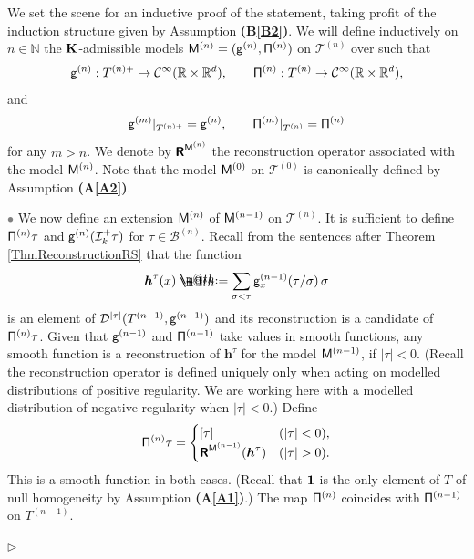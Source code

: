 \documentclass[10pt, reqno]{amsart}
\makeatletter
\numberwithin{subsection}{section}
\numberwithin{subsubsection}{subsection}
\numberwithin{equation}{section} %
\newenvironment{Dem}[1][\unskip]{%
    \begin{list}{\hspace{1.15cm}{\sf \textbf{{\small Proof #1 --}}}}{%
        \setlength{\topsep}{0pt}%
        \setlength{\leftmargin}{0pt}%
        \setlength{\rightmargin}{0pt}%
        \setlength{\listparindent}{0pt}%
        \setlength{\itemindent}{0pt}%
        \setlength{\parsep}{0pt}%
        \addtolength{\leftmargin}{0pt}%
        \addtolength{\rightmargin}{0pt}%
    } \item }{\hfill $\rhd$\end{list}\smallskip}
\theoremstyle{mystyle}
\theoremstyle{mystyle2}
\theoremstyle{mystyle3}
\newcommand{\refA}[1]{\textbf{\textsf{(A\ref{#1})}}}
\newcommand{\refB}[1]{\textbf{\textsf{(B\ref{#1})}}}
\newcommand{\bsh}{\boldsymbol{h}}
\newcommand{\ssk}{\smallskip}
\newcommand\bbN{\mathbb{N}}
\newcommand\bbR{\mathbb{R}}
\newcommand{\mcB}{\mathcal{B}}
\newcommand{\mcC}{\mathcal{C}}
\newcommand{\mcD}{\mathcal{D}}
\newcommand{\mcI}{\mathcal{I}}
\newcommand*{\defeq}{\mathrel{\rlap{%
                     \raisebox{0.3ex}{$\m@th\cdot$}}%
                     \raisebox{-0.3ex}{$\m@th\cdot$}}%
                     =}
\makeatother
\begin{document}
\begin{Dem}
We set the scene for an inductive proof of the statement, taking profit of the induction structure given by Assumption \refB{B2}. 
We will define inductively on $n\in\bbN$ the $\bf K$-admissible models ${\sf M}^{(n)}=({\sf g}^{(n)}, {\sf \Pi}^{(n)})$ on $\mathscr{T}^{(n)}$ over such that
$$
{\sf g}^{(n)} : T^{(n)+} \to \mcC^\infty(\bbR\times\bbR^d),\qquad
{\sf\Pi}^{(n)} : T^{(n)} \to \mcC^\infty(\bbR\times\bbR^d),
$$
and
$$
{\sf g}^{(m)}\vert_{T^{(n)+}}={\sf g}^{(n)},\qquad
{\sf\Pi}^{(m)}\vert_{T^{(n)}}={\sf\Pi}^{(n)}
$$
for any $m>n$. We denote by $\textsf{\textbf{R}}^{{\sf M}^{(n)}}$ the reconstruction operator associated with the model ${\sf M}^{(n)}$.
Note that the model ${\sf M}^{(0)}$ on $\mathscr{T}^{(0)}$ is canonically defined by Assumption \refA{A2}.

\ssk

\textcolor{gray}{$\bullet$} 
We now define an extension ${\sf M}^{(n)}$ of ${\sf M}^{(n-1)}$ on $\mathscr{T}^{(n)}$. It is sufficient to define ${\sf \Pi}^{(n)}\tau$ and ${\sf g}^{(n)}(\mcI_k^+\tau)$ for $\tau\in\mcB^{(n)}$.
Recall from the sentences after Theorem \ref{ThmReconstructionRS} that the function 
$$
\bsh^\tau(x) \defeq  \sum_{\sigma<\tau} {\sf g}_x^{(n-1)}(\tau/\sigma)\,\sigma
$$ 
is an element of $\mcD^{|\tau|}(T^{(n-1)},{\sf g}^{(n-1)})$ and its reconstruction is a candidate of ${\sf\Pi}^{(n)}\tau$.
Given that ${\sf g}^{(n-1)}$ and ${\sf \Pi}^{(n-1)}$ take values in smooth functions, any smooth function is a reconstruction of $\bsh^\tau$ for the model ${\sf M}^{(n-1)}$, if $\vert\tau\vert<0$. (Recall the reconstruction operator is defined uniquely only when acting on modelled distributions of positive regularity. We are working here with a modelled distribution of negative regularity when $|\tau|<0$.) 
Define
$$
{\sf\Pi}^{(n)}\tau=
\begin{cases}
[\tau]&(|\tau|<0),\\
\textsf{\textbf{R}}^{{\sf M}^{(n-1)}}(\bsh^\tau)&(|\tau|>0).
\end{cases}
$$
This is a smooth function in both cases. (Recall that ${\bf1}$ is the only element of $T$ of null homogeneity by Assumption \refA{A1}.) The map ${\sf \Pi}^{(n)}$ coincides with ${\sf \Pi}^{(n-1)}$ on $T^{(n-1)}$.   \vspace{0.1cm}


\end{Dem}
\end{document}
